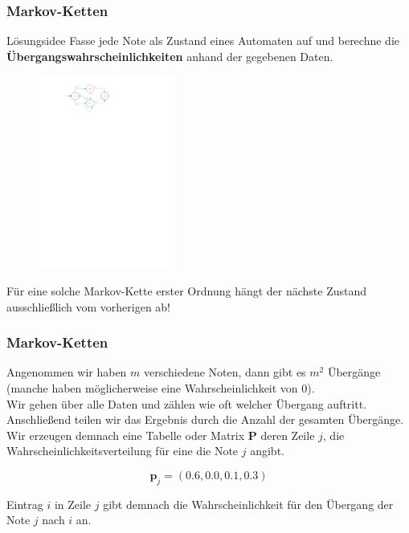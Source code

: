 \documentclass[aspectratio=169]{beamer}
\begin{document}
\begin{frame}
	\frametitle{Markov-Ketten}
	\begin{block}{Lösungsidee}
		Fasse jede Note als Zustand eines Automaten auf und berechne die \textbf{Übergangswahrscheinlichkeiten} anhand der gegebenen Daten.
	\end{block}
		\begin{figure}
		\includegraphics[width=0.4\textwidth]{markov-chain}
	\end{figure}
	Für eine solche Markov-Kette erster Ordnung hängt der nächste Zustand ausschließlich vom vorherigen ab!
\end{frame}


\begin{frame}
	\frametitle{Markov-Ketten}
	Angenommen wir haben $m$ verschiedene Noten, dann  gibt es $m^2$ Übergänge (manche haben möglicherweise eine Wahrscheinlichkeit von 0).\\
	\vspace{1cm}
	Wir gehen über alle Daten und zählen wie oft welcher Übergang auftritt.
	Anschließend teilen wir das Ergebnis durch die Anzahl der gesamten Übergänge.\\
	\vspace{1cm}
	Wir erzeugen demnach eine Tabelle oder Matrix $\mathbf{P}$ deren Zeile $j$, die Wahrscheinlichkeitsverteilung für eine die Note $j$ angibt. 
	
	$$\mathbf{p}_j = (0.6, 0.0, 0.1, 0.3)$$
	
	Eintrag $i$ in Zeile $j$ gibt demnach die Wahrscheinlichkeit für den Übergang der Note $j$ nach $i$ an.
\end{frame}
\end{document}

